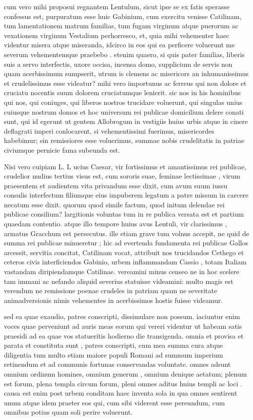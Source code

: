  cum vero mihi proposui regnantem Lentulum, sicut ipse se ex fatis sperasse confessus est, purpuratum esse huic Gabinium, cum exercitu venisse Catilinam, tum lamentationem matrum familias, tum fugam virginum atque puerorum ac vexationem virginum Vestalium perhorresco, et, quia mihi vehementer haec videntur misera atque miseranda, idcirco in eos qui ea perficere voluerunt me severum vehementemque praebebo . etenim quaero, si quis pater familias, liberis suis a servo interfectis, uxore occisa, incensa domo, supplicium de servis non quam acerbissimum sumpserit, utrum is clemens ac misericors an inhumanissimus et crudelissimus esse videatur? mihi vero importunus ac ferreus qui non dolore et cruciatu nocentis suum dolorem cruciatumque lenierit. sic nos in his hominibus qui nos, qui coniuges, qui liberos nostros trucidare voluerunt, qui singulas unius cuiusque nostrum domos et hoc universum rei publicae domicilium delere conati sunt, qui id egerunt ut gentem Allobrogum in vestigiis huius urbis atque in cinere deflagrati imperi conlocarent, si vehementissimi fuerimus, misericordes habebimur; sin remissiores esse voluerimus, summae nobis crudelitatis in patriae civiumque pernicie fama subeunda est.

 Nisi vero cuipiam L. L ucius Caesar, vir fortissimus et amantissimus rei publicae, crudelior nudius tertius visus est, cum sororis suae, feminae lectissimae , virum praesentem et audientem vita privandum esse dixit, cum avum suum iussu consulis interfectum filiumque eius impuberem legatum a patre missum in carcere necatum esse dixit. quorum quod simile factum, quod initum delendae rei publicae consilium? largitionis voluntas tum in re publica versata est et partium quaedam contentio. atque illo tempore huius avus Lentuli, vir clarissimus , armatus Gracchum est persecutus. ille etiam grave tum volnus accepit, ne quid de summa rei publicae minueretur ; hic ad evertenda fundamenta rei publicae Gallos arcessit, servitia concitat, Catilinam vocat, attribuit nos trucidandos Cethego et ceteros civis interficiendos Gabinio, urbem inflammandam Cassio , totam Italiam vastandam diripiendamque Catilinae. vereamini minus censeo ne in hoc scelere tam immani ac nefando aliquid severius statuisse videamini: multo magis est verendum ne remissione poenae crudeles in patriam quam ne severitate animadversionis nimis vehementes in acerbissimos hostis fuisse videamur.

 sed ea quae exaudio, patres conscripti, dissimulare non possum. iaciuntur enim voces quae perveniunt ad auris meas eorum qui vereri videntur ut habeam satis praesidi ad ea quae vos statueritis hodierno die transigenda. omnia et provisa et parata et constituta sunt , patres conscripti, cum mea summa cura atque diligentia tum multo etiam maiore populi Romani ad summum imperium retinendum et ad communis fortunas conservandas voluntate. omnes adsunt omnium ordinum homines, omnium generum , omnium denique aetatum; plenum est forum, plena templa circum forum, pleni omnes aditus huius templi ac loci . causa est enim post urbem conditam haec inventa sola in qua omnes sentirent unum atque idem praeter eos qui, cum sibi viderent esse pereundum, cum omnibus potius quam soli perire voluerunt.

